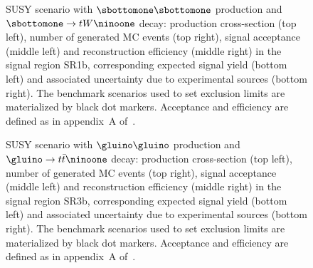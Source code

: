 \begin{figure}[p]
\centering
{}
\caption{SUSY scenario with $\sbottomone\sbottomone$ production and $\sbottomone\to tW\ninoone$ decay: 
production cross-section (top left), number of generated MC events (top right), 
signal acceptance (middle left) and reconstruction efficiency (middle right) in the signal region SR1b, 
corresponding expected signal yield (bottom left) and associated uncertainty due to experimental sources (bottom right). 
The benchmark scenarios used to set exclusion limits are materialized by black dot markers. 
Acceptance and efficiency are defined as in appendix~A of~\cite{SUSY-2013-19}.}
\label{HEPData_SR1b} 
\end{figure}

\begin{figure}[p]
\centering
{}
\caption{SUSY scenario with $\gluino\gluino$ production and $\gluino\to t\bar t\ninoone$ decay: 
production cross-section (top left), number of generated MC events (top right), 
signal acceptance (middle left) and reconstruction efficiency (middle right) in the signal region SR3b, 
corresponding expected signal yield (bottom left) and associated uncertainty due to experimental sources (bottom right). 
The benchmark scenarios used to set exclusion limits are materialized by black dot markers. 
Acceptance and efficiency are defined as in appendix~A of~\cite{SUSY-2013-19}.}
\label{HEPData_SR3b} 
\end{figure} 
